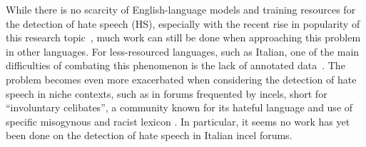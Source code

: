 \documentclass[11pt]{article}
\begin{document}

While there is no scarcity of English-language models and training resources for
the detection of hate speech (HS), especially with the recent rise in popularity of
this research topic~\cite{alkomahLiteratureReviewTextual2022},
much work can still be done when approaching this problem in other languages.
For less-resourced languages, such as Italian, one of the main difficulties of combating this phenomenon is the lack of annotated data~\cite{van2023mitigating}. The problem becomes even more
exacerbated when considering the detection of hate speech in niche contexts,
such as in forums frequented by incels,
short for ``involuntary celibates'', a community known for its hateful language \cite{nagle-2017-kill-normies,jakiOnlineHatredWomen2019}
and use of
specific misogynous and racist lexicon \cite{farrellExploringMisogynyManosphere2019,gothard2020exploring}.
In particular, it seems no work has yet been done on the detection of hate speech in Italian incel forums.
\end{document}
